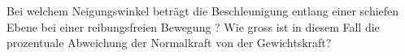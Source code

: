 Bei welchem Neigungswinkel beträgt die Beschleunigung entlang einer schiefen Ebene bei einer reibungsfreien Bewegung \aEbO? Wie gross ist in diesem Fall die prozentuale Abweichung der Normalkraft von der Gewichtskraft?
